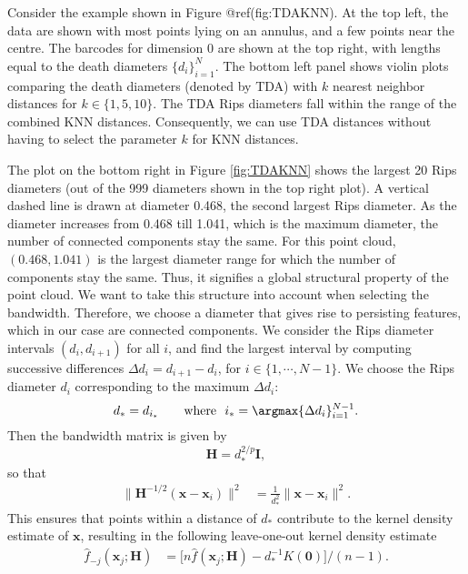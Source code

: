 \documentclass[
]{article}
\begin{document}
Consider the example shown in Figure @ref(fig:TDAKNN). At the top left,
the data are shown with most points lying on an annulus, and a few
points near the centre. The barcodes for dimension 0 are shown at the
top right, with lengths equal to the death diameters
\(\{d_i\}_{i = 1}^N\). The bottom left panel shows violin plots
comparing the death diameters (denoted by TDA) with \(k\) nearest
neighbor distances for \(k \in \{1, 5, 10\}\). The TDA Rips diameters
fall within the range of the combined KNN distances. Consequently, we
can use TDA distances without having to select the parameter \(k\) for
KNN distances.

The plot on the bottom right in Figure \ref{fig:TDAKNN} shows the
largest 20 Rips diameters (out of the 999 diameters shown in the top
right plot). A vertical dashed line is drawn at diameter 0.468, the
second largest Rips diameter. As the diameter increases from 0.468 till
1.041, which is the maximum diameter, the number of connected components
stay the same. For this point cloud, \((0.468, 1.041)\) is the largest
diameter range for which the number of components stay the same. Thus,
it signifies a global structural property of the point cloud. We want to
take this structure into account when selecting the bandwidth.
Therefore, we choose a diameter that gives rise to persisting features,
which in our case are connected components. We consider the Rips
diameter intervals \((d_i, d_{i+1})\) for all \(i\), and find the
largest interval by computing successive differences
\(\Delta d_i = d_{i+1} - d_i\), for \(i \in \{1, \cdots, N-1 \}\). We
choose the Rips diameter \(d_i\) corresponding to the maximum
\(\Delta d_i\): \begin{equation}\label{eq:deathrad2}
    d_* = d_{i_*} \qquad \text{where ~} i_*  = \argmax \{ \Delta d_i \}_{i=1}^{N-1}.
\end{equation} Then the bandwidth matrix is given by
\begin{equation}\label{eq:bandwidth}
    \bm{H} = d_*^{2/p} \bm{I},
\end{equation} so that \begin{align}\label{eq:kde11}
    \| \bm{H}^{-1/2}(\bm{x} - \bm{x}_i) \|^2
      & = \frac{1}{d_*^2}\|\bm{x} - \bm{x}_i \|^2  .
\end{align} This ensures that points within a distance of \(d_*\)
contribute to the kernel density estimate of \(\bm{x}\), resulting in
the following leave-one-out kernel density estimate
\begin{align}\label{eq:kde12}
    \hat{f}_{-j}(\bm{x}_j;\bm{H})
      & = \big[ n \hat{f}(\bm{x}_j;\bm{H}) - d_*^{-1} K(\bm{0})\big]/(n-1).
\end{align}
\end{document}
